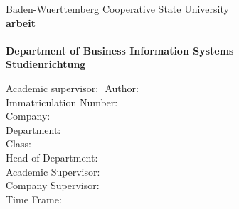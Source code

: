 \begin{titlepage}

\begin{minipage}{\textwidth}
		\vspace{-2cm}
\end{minipage}
\vspace{1em}
\rmfamily


 \begin{center}
	{\textsf{\large Baden-Wuerttemberg Cooperative State University}}\\[4em]
	{\textsf{\textbf{\large{\DieArtDerArbeit}arbeit}}}\\[6mm]
	{\textsf{\textbf{\Large{}\DerTitelDerArbeit}}} \\[1.5cm]
	{\textsf{\textbf{\large{}Department of Business Information Systems}}\\[6mm]
	\textsf{\textbf{Studienrichtung \DieStudienrichtung}}}\vspace{10em}
	
	\begin{minipage}{\textwidth}
		\begin{tabbing}
		Academic supervisor: \hspace{0.85cm}\=\kill
		Author: \> \DerAutorDerArbeit \\[1.5mm]
		Immatriculation Number: \> \DieMatrikelnummer \\[1.5mm]
		Company: \> \DerNameDerFirma  \\[1.5mm]
		Department: \> \DerNameDerAbteilung \\[1.5mm]
		Class: \> \DieKursbezeichnung \\[1.5mm]
		Head of Department: \> \DerStudiengangsleiter \\[1.5mm]
		Academic Supervisor: \> \DerWissBetreuer \\[1.5mm]
		Company Supervisor: \> \DerFirmenBetreuer \\[1.5mm]
		Time Frame: \> \DerBearbeitungszeitraum\\[1.5mm]
		\end{tabbing}
	\end{minipage}
\end{center}

\end{titlepage}